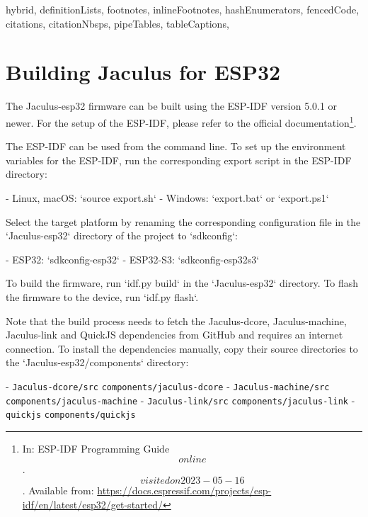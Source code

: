 \begin{markdown*}{%
  hybrid,
  definitionLists,
  footnotes,
  inlineFootnotes,
  hashEnumerators,
  fencedCode,
  citations,
  citationNbsps,
  pipeTables,
  tableCaptions,
}

\appendix

\chapter{Building Jaculus for ESP32}

The Jaculus-esp32 firmware can be built using the ESP-IDF version 5.0.1 or newer. For the setup of the ESP-IDF, please refer to the official documentation\footnote{In: ESP-IDF Programming Guide \[online\]. \[visited on 2023-05-16\]. Available from: \url{https://docs.espressif.com/projects/esp-idf/en/latest/esp32/get-started/}}.

The ESP-IDF can be used from the command line. To set up the environment variables for the ESP-IDF, run the corresponding export script in the ESP-IDF directory:

- Linux, macOS: `source export.sh`
- Windows: `export.bat` or `export.ps1`

Select the target platform by renaming the corresponding configuration file in the `Jaculus-esp32` directory of the project to `sdkconfig`:

- ESP32: `sdkconfig-esp32`
- ESP32-S3: `sdkconfig-esp32s3`

To build the firmware, run `idf.py build` in the `Jaculus-esp32` directory. To flash the firmware to the device, run `idf.py flash`.

Note that the build process needs to fetch the Jaculus-dcore, Jaculus-machine, Jaculus-link and QuickJS dependencies from GitHub and requires an internet connection. To install the dependencies manually, copy their source directories to the `Jaculus-esp32/components` directory:

- \texttt{Jaculus-dcore/src} \rightarrow \texttt{components/jaculus-dcore}
- \texttt{Jaculus-machine/src} \rightarrow \texttt{components/jaculus-machine}
- \texttt{Jaculus-link/src} \rightarrow \texttt{components/jaculus-link}
- \texttt{quickjs} \rightarrow \texttt{components/quickjs}


\end{markdown*}
